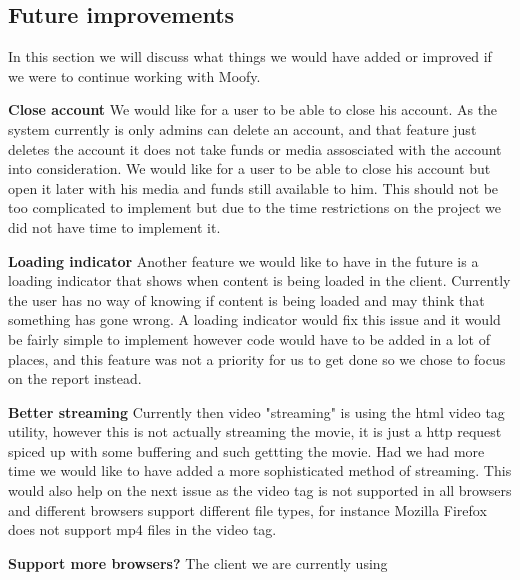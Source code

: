 \subsection{Future improvements}
In this section we will discuss what things we would have added or improved if we were to continue working with Moofy.

\textbf{Close account } We would like for a user to be able to close his account. As the system currently is only admins can delete an account,
and that feature just deletes the account it does not take funds or media assosciated with the account into consideration. We would like for a
user to be able to close his account but open it later with his media and funds still available to him. This should not be too complicated to 
implement but due to the time restrictions on the project we did not have time to implement it.

\textbf{Loading indicator } Another feature we would like to have in the future is a loading indicator that shows when content is being loaded in the client. 
Currently the user has no way of knowing if content is being loaded and may think that something has  gone wrong. A loading indicator would fix this issue 
and it would be fairly simple to implement however code would have to be added in a lot of places, and this feature was not a priority for us to get done so
we chose to focus on the report instead.

\textbf{Better streaming} Currently then video "streaming" is using the html video tag utility, however this is not actually streaming the movie, it is just
a http request spiced up with some buffering and such gettting the movie. Had we had more time we would like to have added a more sophisticated method
of streaming. This would also help on the next issue as the video tag is not supported in all browsers and different browsers support different file types, for
instance Mozilla Firefox does not support mp4 files in the video tag.

\textbf{Support more browsers?} The client we are currently using 